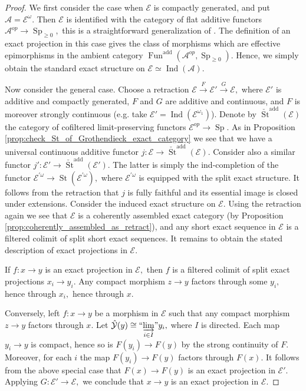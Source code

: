 \documentclass[11pt,leqno]{amsart}
\numberwithin{equation}{section}
\newcommand{\indlim}[1][]{\mathop{\varinjlim}\limits_{#1}}
\newcommand{\inddlim}[1][]{{``{\indlim[#1]}"}}
\newcommand{\xto}{\xrightarrow}
\newcommand{\St}{\operatorname{St}}
\newcommand{\cA}{{\mathcal A}}
\newcommand{\cE}{{\mathcal E}}
\newcommand{\cY}{{\mathcal Y}}
\newcommand{\Fun}{\operatorname{Fun}}
\newcommand{\Sp}{\operatorname{Sp}}
\newcommand{\add}{\operatorname{add}}
\newcommand{\Ind}{\operatorname{Ind}}
\begin{document}
\begin{proof}
We first consider the case when $\cE$ is compactly generated, and put $\cA=\cE^{\omega}.$ Then $\cE$ is identified with the category of flat additive functors $\cA^{op}\to\Sp_{\geq 0},$ this is a straightforward generalization of \cite[Theorem 7.2.2.15]{Lur17a}. The definition of an exact projection in this case gives the class of morphisms which are effective epimorphisms in the ambient category $\Fun^{\add}(\cA^{op},\Sp_{\geq 0}).$ Hence, we simply obtain the standard exact structure on $\cE\simeq\Ind(\cA).$

Now consider the general case. Choose a retraction $\cE\xto{F}\cE'\xto{G}\cE,$ where $\cE'$ is additive and compactly generated, $F$ and $G$ are additive and continuous, and $F$ is moreover strongly continuous (e.g. take $\cE'=\Ind(\cE^{\omega_1})$). Denote by $\check{\St}^{\add}(\cE)$ the category of cofiltered limit-preserving functors $\cE^{op}\to\Sp.$ As in Proposition \ref{prop:check_St_of_Grothendieck_exact_category} we see that we have a universal continuous additive functor $j:\cE\to\check{\St}^{\add}(\cE).$ Consider also a similar functor $j':\cE'\to\check{\St}^{\add}(\cE').$ The latter is simply the ind-completion of the functor $\cE^{'\omega}\to\St(\cE^{'\omega}),$ where $\cE^{'\omega}$ is equipped with the split exact structure. It follows from the retraction that $j$ is fully faithful and its essential image is closed under extensions. Consider the induced exact structure on $\cE.$ Using the retraction again we see that $\cE$ is a coherently assembled exact category (by Proposition \ref{prop:coherently_assembled_as_retract}), and any short exact sequence in $\cE$ is a filtered colimit of split short exact sequences. It remains to obtain the stated description of exact projections in $\cE.$

If $f:x\to y$ is an exact projection in $\cE,$ then $f$ is a filtered colimit of split exact projections $x_i\to y_i.$ Any compact morphism $z\to y$ factors through some $y_i,$ hence through $x_i,$ hence through $x.$

Conversely, left $f:x\to y$ be a morphism in $\cE$ such that any compact morphism $z\to y$ factors through $x.$ Let $\hat{\cY}(y)\cong \inddlim[i\in I]y_i,$ where $I$ is directed. Each map $y_i\to y$ is compact, hence so is $F(y_i)\to F(y)$ by the strong continuity of $F.$ Moreover, for each $i$ the map $F(y_i)\to F(y)$ factors through $F(x).$ It follows from the above special case that $F(x)\to F(y)$ is an exact projection in $\cE'.$ Applying $G:\cE'\to\cE,$ we conclude that $x\to y$ is an exact projection in $\cE.$
\end{proof}
\end{document}
